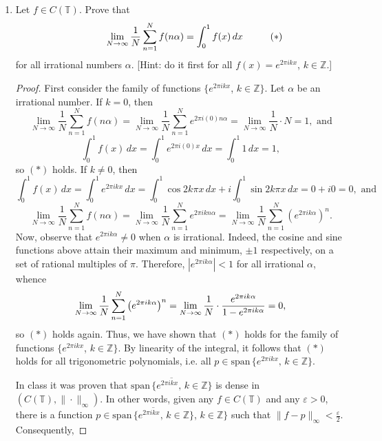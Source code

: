 \documentclass[11pt,oneside,english]{amsart}
\theoremstyle{definition}
\newcommand{\pspace}{\hspace{10mm}}
\newcommand{\lom}[2]{\lim_{{#1}\rightarrow{#2}}}
\newcommand{\ve}{\varepsilon}
\newcommand{\MB}[1]{\mathbb{#1}}
\begin{document}
\begin{enumerate}
\item Let $f\in C(\MB{T})$. Prove that
\[
\pspace\lom{N}{\infty}\frac{1}{N}\sum_{n=1}^Nf(n\alpha)=\int_0^1f(x)\,dx\pspace(*)
\]
for all irrational numbers $\alpha$. [Hint: do it first for all $f(x)=e^{2\pi ikx}$, $k\in\MB{Z}$.]

\begin{proof}
First consider the family of functions $\{e^{2\pi ikx}$, $k\in\MB{Z}\}$. Let $\alpha$ be an irrational number. If $k=0$, then
\[
\lom{N}{\infty}\frac{1}{N}\sum_{n=1}^Nf(n\alpha)=\lom{N}{\infty}\frac{1}{N}\sum_{n=1}^Ne^{2\pi i (0)n\alpha}=\lom{N}{\infty}\frac{1}{N}\cdot N=1,\text{ and}
\]
\[
\int_0^1f(x)\,dx=\int_0^1e^{2\pi i(0)x}\,dx=\int_0^1 1\,dx =1,
\]
so $(*)$ holds. If $k\neq 0$, then 
\[
\int_0^1f(x)\,dx=\int_0^1e^{2\pi ikx}\,dx=\int_0^1\cos2k\pi x\,dx+i\int_0^1\sin2k\pi x\,dx=0+i0=0,\text{ and}
\]
\[
\lom{N}{\infty}\frac{1}{N}\sum_{n=1}^Nf(n\alpha)=\lom{N}{\infty}\frac{1}{N}\sum_{n=1}^Ne^{2\pi i k n\alpha}=\lom{N}{\infty}\frac{1}{N}\sum_{n=1}^N\left(e^{2\pi i k \alpha}\right)^n.
\]
Now, observe that $e^{2\pi ik\alpha}\neq0$ when $\alpha$ is irrational. Indeed, the cosine and sine functions above attain their maximum and minimum, $\pm1$ respectively, on a set of rational multiples of $\pi$. Therefore, $\left|e^{2\pi ik\alpha}\right|<1$ for all irrational $\alpha$, whence
\[
\lom{N}{\infty}\frac{1}{N}\sum_{n=1}^N\left(e^{2\pi i k \alpha}\right)^n=\lom{N}{\infty}\frac{1}{N}\cdot\frac{e^{2\pi i k\alpha}}{1-e^{2\pi ik\alpha}}\\[2mm]=0,
\]
so $(*)$ holds again. Thus, we have shown that $(*)$ holds for the family of functions $\{e^{2\pi ikx}$, $k\in\MB{Z}\}$. By linearity of the integral, it follows that $(*)$ holds for all trigonometric polynomials, i.e. all $p\in \text{span}\,\{e^{2\pi ikx},\,k\in\MB{Z}\}$.

In class it was proven that $\overline{\text{span}\,\{e^{2\pi ikx},\,k\in\MB{Z}\}}$ is dense in $(C(\MB{T}),\|\cdot\|_\infty)$. In other words, given any $f\in C(\MB{T})$ and any $\ve>0$, there is a function $p\in \overline{\text{span}\,\{e^{2\pi ikx},\,k\in\MB{Z}\}}$, $k\in\MB{Z}\}$ such that $\|f-p\|_\infty<\frac{\ve}{2}$. Consequently,


\end{proof}
\end{enumerate}
\end{document}
